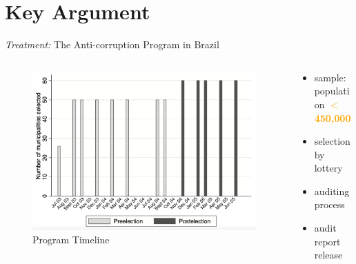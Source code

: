 \section{Key Argument}
    
    \frame{\sectionpage}
    
    \begin{frame}{\textit{Treatment:} The Anti-corruption Program in Brazil}
    
    \begin{columns}

    \begin{column}{0.5\textwidth}
        \begin{figure}\label{fig1}
        \centering
        \includegraphics[height = 0.65 \textheight]{images/fig1.png}
        \caption{Program Timeline}
        \end{figure}
    \end{column}
    
    \begin{column}{0.4\textwidth}
    
    \begin{itemize}
      	\item<2-> sample: population \textbf<3->{\textcolor<3->{orange}{$<$450,000}}
      	\item<5-> selection by lottery
      	\item<6-> auditing process
      	\item<8-> audit report release
      \end{itemize}
    
    

\end{column}
\end{columns}
\end{frame}
